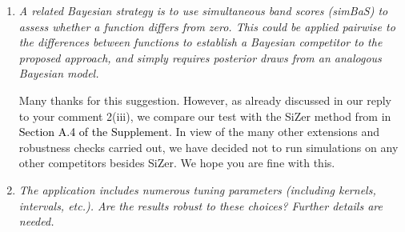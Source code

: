 \documentclass[a4paper,12pt]{article}
\newcommand{\reference}[1]{\textcolor{black}{#1}}
\begin{document}
\begin{enumerate}[label=\arabic*.,leftmargin=0.6cm]
    
\item \textit{A related Bayesian strategy is to use simultaneous band scores (simBaS) to assess whether a function differs from zero. This could be applied pairwise to the differences between functions to establish a Bayesian competitor to the proposed approach, and simply requires posterior draws from an analogous Bayesian model.}

Many thanks for this suggestion. However, as already discussed in our reply to your comment 2(iii), we compare our test with the SiZer method from \cite{Park2009} in \reference{Section A.4 of the Supplement}. In view of the many other extensions and robustness checks carried out, we have decided not to run simulations on any other competitors besides SiZer. We hope you are fine with this. 
 
  
\item \textit{The application includes numerous tuning parameters (including kernels, intervals, etc.). Are the results robust to these choices? Further details are needed.}
  

\end{enumerate}
\end{document}
